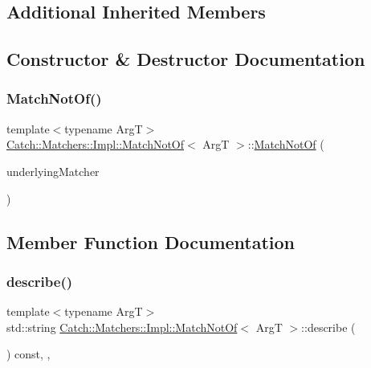 \subsection*{Additional Inherited Members}


\subsection{Constructor \& Destructor Documentation}
\mbox{\label{structCatch_1_1Matchers_1_1Impl_1_1MatchNotOf_a47afdd9e4c3354cef85adc3186097ae4}} 
\subsubsection{\texorpdfstring{Match\+Not\+Of()}{MatchNotOf()}}
{\footnotesize\ttfamily template$<$typename ArgT$>$ \\
\mbox{\hyperlink{structCatch_1_1Matchers_1_1Impl_1_1MatchNotOf}{Catch\+::\+Matchers\+::\+Impl\+::\+Match\+Not\+Of}}$<$ ArgT $>$\+::\mbox{\hyperlink{structCatch_1_1Matchers_1_1Impl_1_1MatchNotOf}{Match\+Not\+Of}} (\begin{DoxyParamCaption}\item[{\mbox{\hyperlink{structCatch_1_1Matchers_1_1Impl_1_1MatcherBase}{Matcher\+Base}}$<$ ArgT $>$ const \&}]{underlying\+Matcher }\end{DoxyParamCaption})\hspace{0.3cm}{\ttfamily [inline]}}



\subsection{Member Function Documentation}
\mbox{\label{structCatch_1_1Matchers_1_1Impl_1_1MatchNotOf_ac5fb4ef6a9069d23a4098c3c818f06b0}} 
\subsubsection{\texorpdfstring{describe()}{describe()}}
{\footnotesize\ttfamily template$<$typename ArgT$>$ \\
std\+::string \mbox{\hyperlink{structCatch_1_1Matchers_1_1Impl_1_1MatchNotOf}{Catch\+::\+Matchers\+::\+Impl\+::\+Match\+Not\+Of}}$<$ ArgT $>$\+::describe (\begin{DoxyParamCaption}{ }\end{DoxyParamCaption}) const\hspace{0.3cm}{\ttfamily [inline]}, {\ttfamily [override]}, {\ttfamily [virtual]}}



